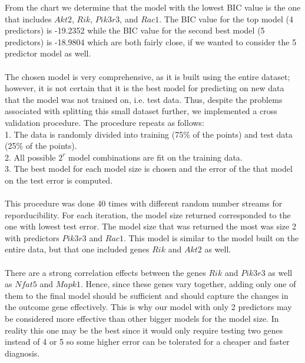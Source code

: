 \documentclass{article}
\begin{document}
From the chart we determine that the model with the lowest BIC value is the one that includes $Akt2$, $Rik$, $Pik3r3$, and $Rac1$.  The BIC value for the top model (4 predictors) is  -19.2352 while the BIC value for the second best model (5 predictors) is -18.9804 which are both fairly close, if we wanted to consider the 5 predictor model as well.\\
\null\\
The chosen model is very comprehensive, as it is built using the entire dataset; however, it is not certain that it is the best model for predicting on new data that the model was not trained on, i.e. test data.  Thus, despite the problems associated with splitting this small dataset further, we implemented a cross validation procedure. The procedure repeats as follows:\\
1. The data is randomly divided into training (75\% of the points) and test data (25\% of the points).\\
2. All possible $2^r$ model combinations are fit on the training data.\\
3. The best model for each model size is chosen and the error of the that model on the test error is computed. \\
\null\\
This procedure was done 40 times with different random number streams for reporducibility.  For each iteration, the model size returned corresponded to the one with lowest test error.  The model size that was returned the most was size 2 with predictors $Pik3r3$ and $Rac1$. This model is similar to the model built on the entire data, but that one included genes $Rik$ and $Akt2$ as well.\\
\null\\
There are a strong correlation effects between the genes $Rik$ and $Pik3r3$ as well as $Nfat5$ and $Mapk1$. Hence, since these genes vary together, adding only one of them to the final model should be sufficient and should capture the changes in the outcome gene effectively. This is why our model with only 2 predictors may be considered more effective than other bigger models for the model size.  In reality this one may be the best since it would only require testing two genes instead of 4 or 5 so some higher error can be tolerated for a cheaper and faster diagnosis.
%
\end{document}
